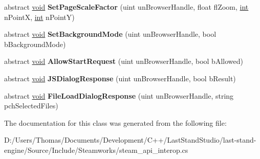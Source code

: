 \begin{DoxyCompactItemize}
\item 
\hypertarget{classValve_1_1Steamworks_1_1ISteamHTMLSurface_a1ec905c4e7aa9e95a498a4372d2a92e4}{}abstract \hyperlink{SDL__audio_8h_a52835ae37c4bb905b903cbaf5d04b05f}{void} {\bfseries Set\+Page\+Scale\+Factor} (uint un\+Browser\+Handle, float fl\+Zoom, \hyperlink{SDL__thread_8h_a6a64f9be4433e4de6e2f2f548cf3c08e}{int} n\+Point\+X, \hyperlink{SDL__thread_8h_a6a64f9be4433e4de6e2f2f548cf3c08e}{int} n\+Point\+Y)\label{classValve_1_1Steamworks_1_1ISteamHTMLSurface_a1ec905c4e7aa9e95a498a4372d2a92e4}

\item 
\hypertarget{classValve_1_1Steamworks_1_1ISteamHTMLSurface_ab6db6bca31171e788dbfe9870fc9d872}{}abstract \hyperlink{SDL__audio_8h_a52835ae37c4bb905b903cbaf5d04b05f}{void} {\bfseries Set\+Background\+Mode} (uint un\+Browser\+Handle, bool b\+Background\+Mode)\label{classValve_1_1Steamworks_1_1ISteamHTMLSurface_ab6db6bca31171e788dbfe9870fc9d872}

\item 
\hypertarget{classValve_1_1Steamworks_1_1ISteamHTMLSurface_a4becebabd6f86e5174266759add083bf}{}abstract \hyperlink{SDL__audio_8h_a52835ae37c4bb905b903cbaf5d04b05f}{void} {\bfseries Allow\+Start\+Request} (uint un\+Browser\+Handle, bool b\+Allowed)\label{classValve_1_1Steamworks_1_1ISteamHTMLSurface_a4becebabd6f86e5174266759add083bf}

\item 
\hypertarget{classValve_1_1Steamworks_1_1ISteamHTMLSurface_a34e3fd8fc742a1419c15e58e17486789}{}abstract \hyperlink{SDL__audio_8h_a52835ae37c4bb905b903cbaf5d04b05f}{void} {\bfseries J\+S\+Dialog\+Response} (uint un\+Browser\+Handle, bool b\+Result)\label{classValve_1_1Steamworks_1_1ISteamHTMLSurface_a34e3fd8fc742a1419c15e58e17486789}

\item 
\hypertarget{classValve_1_1Steamworks_1_1ISteamHTMLSurface_a5580932dde2abeb61ab6b4f100a7e7c5}{}abstract \hyperlink{SDL__audio_8h_a52835ae37c4bb905b903cbaf5d04b05f}{void} {\bfseries File\+Load\+Dialog\+Response} (uint un\+Browser\+Handle, string pch\+Selected\+Files)\label{classValve_1_1Steamworks_1_1ISteamHTMLSurface_a5580932dde2abeb61ab6b4f100a7e7c5}

\end{DoxyCompactItemize}


The documentation for this class was generated from the following file\+:\begin{DoxyCompactItemize}
\item 
D\+:/\+Users/\+Thomas/\+Documents/\+Development/\+C++/\+Last\+Stand\+Studio/last-\/stand-\/engine/\+Source/\+Include/\+Steamworks/steam\+\_\+api\+\_\+interop.\+cs\end{DoxyCompactItemize}
